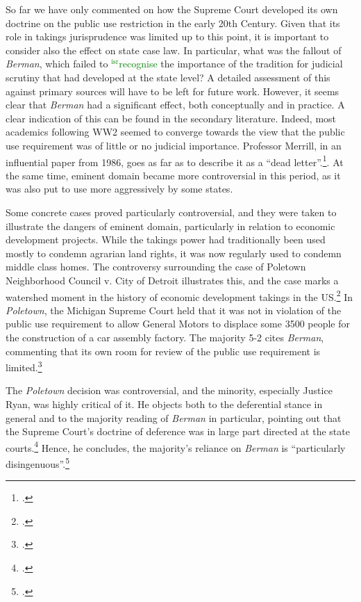 \documentclass[12pt,a4paper]{book} %
\newcommand{\isr}[1]{\textcolor{green}{$^{\textrm{isr}}${#1}}}
\begin{document}
So far we have only commented on how the Supreme Court developed its own doctrine on the public use restriction in the early 20th Century. Given that its role in takings jurisprudence was limited up to this point, it is important to consider also the effect on state case law. In particular, what was the fallout of {\it Berman}, which failed to \isr{recognise} the importance of the tradition for judicial scrutiny that had developed at the state level? A detailed assessment of this against primary sources will have to be left for future work. However, it seems clear that {\it Berman} had a significant effect, both conceptually and in practice. A clear indication of this can be found in the secondary literature. Indeed, most academics following WW2 seemed to converge towards the view that the public use requirement was of little or no judicial importance. Professor Merrill, in an influential paper from 1986, goes as far as to describe it as a ``dead letter''.\footcite{merrill86}. At the same time, eminent domain became more controversial in this period, as it was also put to use more aggressively by some states.

 Some concrete cases proved particularly controversial, and they were taken to illustrate the dangers of eminent domain, particularly in relation to economic development projects. While the takings power had traditionally been used mostly to condemn agrarian land rights, it was now regularly used to condemn middle class homes. The controversy surrounding the case of Poletown Neighborhood Council v. City of Detroit  illustrates this, and the case marks a watershed moment in the history of  economic development takings in the US.\footcite[See][380-381]{sandefur05} In {\it Poletown}, the Michigan Supreme Court held that it was not in violation of the public use requirement to allow General Motors to displace some 3500 people for the construction of a car assembly factory. The majority 5-2 cites {\it Berman}, commenting that its own room for review of the public use requirement is limited.\footcite[632-633]{poletown81}

The {\it Poletown} decision was controversial, and the minority, especially Justice Ryan, was highly critical of it. He objects both to the deferential stance in general and to the majority reading of {\it Berman} in particular, pointing out that the Supreme Court's doctrine of deference was in large part directed at the state courts.\footcite[668]{poletown81} Hence, he concludes, the majority's reliance on {\it Berman} is ``particularly disingenuous''.\footcite[668]{poletown81} 
\end{document}
